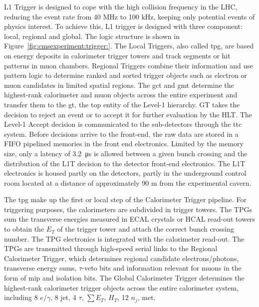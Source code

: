 L1 Trigger is designed to cope with the high collision frequency in the LHC, reducing the event rate from 40 MHz to 100 kHz, keeping only potential events of physics interest. To achieve this, L1 trigger is designed with three component: local, regional and global. The logic structure is shown in Figure~\ref{fig:cmsexperiment:trigger:}. The Local Triggers, also called \acrfull{tpg}, are based on energy deposits in calorimeter trigger towers and track segments or hit patterns in muon chambers. Regional Triggers combine their information and use pattern logic to determine ranked and sorted trigger objects such as electron or muon candidates in limited spatial regions. The \acrfull{gct} and \acrfull{gmt} determine the highest-rank calorimeter and muon objects across the entire experiment and transfer them to the \acrfull{gt}, the top entity of the Level-1 hierarchy. GT takes the decision to reject an event or to accept it for further evaluation by the HLT. The Level-1 Accept decision is communicated to the sub-detectors through the \acrfull{ttc} system. Before decisions arrive to the front-end, the raw data are stored in a FIFO pipelined memories in the front end electronics. Limited by the memory size, only a latency of \SI{3.2}{\us} is allowed between a given bunch crossing and the distribution of the L1T decision to the detector front-end electronics. The L1T electronics is housed partly on the detectors, partly in the underground control room located at a distance of approximately 90 m from the experimental cavern. 


The \acrfull{tpg} make up the first or local step of the Calorimeter Trigger pipeline. For triggering purposes, the calorimeters are subdivided in trigger towers. The TPGs sum the transverse energies measured in ECAL crystals or HCAL read-out towers to obtain the $E_T$ of the trigger tower and attach the correct bunch crossing number. The TPG electronics is integrated with the calorimeter read-out. The TPGs are transmitted through high-speed serial links to the Regional Calorimeter Trigger, which determines regional candidate electrons/photons, transverse energy sums, $\tau$-veto bits and information relevant for muons in the form of \acrfull{mip} and isolation bits. The Global Calorimeter Trigger determines the highest-rank calorimeter trigger objects across the entire calorimeter system, including 8 $e/\gamma$, 8 jet, 4 $\tau$, $\sum E_T$, $H_T$, 12 $n_j$, met.

